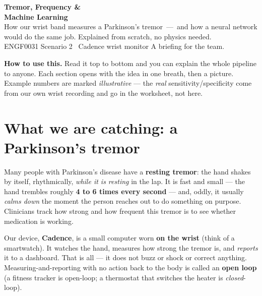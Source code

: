 \documentclass[11pt]{article}
\begin{document}
\begin{tcolorbox}[enhanced, colback=teal, colframe=teal, arc=4pt,
  left=16pt, right=16pt, top=13pt, bottom=13pt, boxrule=0pt]
  {\color{white}\Huge\bfseries Tremor, Frequency \&\\[2pt] Machine Learning}\\[5pt]
  {\color{white}\large How our wrist band measures a Parkinson's tremor
   \,---\, and how a neural network would do the same job. Explained from
   scratch, no physics needed.}\\[8pt]
  {\color{tealbg}\footnotesize ENGF0031 Scenario 2 \textbullet\ Cadence wrist
   monitor \quad\textbullet\quad A briefing for the team.}
\end{tcolorbox}

\vspace{2pt}
\noindent\small \textbf{How to use this.} Read it top to bottom and you can
explain the whole pipeline to anyone. Each section opens with the idea in one
breath, then a picture. Example numbers are marked \emph{illustrative} --- the
\emph{real} sensitivity/specificity come from our own wrist recording and go in
the worksheet, not here.
\normalsize

\section{What we are catching: a Parkinson's tremor}

Many people with Parkinson's disease have a \textbf{resting tremor}: the hand
shakes by itself, rhythmically, \emph{while it is resting} in the lap. It is
fast and small --- the hand trembles roughly \textbf{4 to 6 times every second}
--- and, oddly, it usually \emph{calms down} the moment the person reaches out
to do something on purpose. Clinicians track how strong and how frequent this
tremor is to see whether medication is working.

Our device, \textbf{Cadence}, is a small computer worn \textbf{on the wrist}
(think of a smartwatch). It watches the hand, measures how strong the tremor is,
and \emph{reports} it to a dashboard. That is all --- it does not buzz or shock
or correct anything. Measuring-and-reporting with no action back to the body is
called an \textbf{open loop} (a fitness tracker is open-loop; a thermostat that
switches the heater is \emph{closed}-loop).
\end{document}
